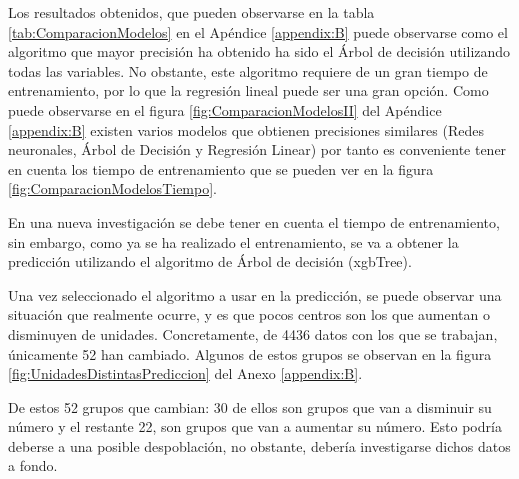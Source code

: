 Los resultados obtenidos, que pueden observarse en la tabla \ref{tab:ComparacionModelos} en el Apéndice \ref{appendix:B} puede observarse como el algoritmo que mayor precisión ha obtenido ha sido el Árbol de decisión utilizando todas las variables. No obstante, este algoritmo requiere de un gran tiempo de entrenamiento, por lo que la regresión lineal puede ser una gran opción. Como puede observarse en el figura \ref{fig:ComparacionModelosII} del Apéndice \ref{appendix:B} existen varios modelos que obtienen precisiones similares (Redes neuronales, Árbol de Decisión y Regresión Linear) por tanto es conveniente tener en cuenta los tiempo de entrenamiento que se pueden ver en la figura \ref{fig:ComparacionModelosTiempo}.

En una nueva investigación se debe tener en cuenta el tiempo de entrenamiento, sin embargo, como ya se ha realizado el entrenamiento, se va a obtener la predicción utilizando el algoritmo de Árbol de decisión (xgbTree). 

Una vez seleccionado el algoritmo a usar en la predicción, se puede observar una situación que realmente ocurre, y es que pocos centros son los que aumentan o disminuyen de unidades. Concretamente, de 4436 datos con los que se trabajan, únicamente 52 han cambiado. Algunos de estos grupos se observan en la figura \ref{fig:UnidadesDistintasPrediccion} del Anexo \ref{appendix:B}.

De estos 52 grupos que cambian: 30 de ellos son grupos que van a disminuir su número y el restante 22, son grupos que van a aumentar su número. Esto podría deberse a una posible despoblación, no obstante, debería investigarse dichos datos a fondo.





